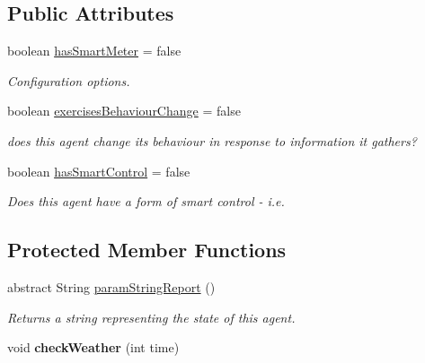 \subsection*{Public Attributes}
\begin{DoxyCompactItemize}
\item 
boolean \hyperlink{classuk_1_1ac_1_1dmu_1_1iesd_1_1cascade_1_1agents_1_1prosumers_1_1_prosumer_agent_a6d748d17b6118067086a69c34b4469a7}{has\-Smart\-Meter} = false
\begin{DoxyCompactList}\small\item\em Configuration options. \end{DoxyCompactList}\item 
\hypertarget{classuk_1_1ac_1_1dmu_1_1iesd_1_1cascade_1_1agents_1_1prosumers_1_1_prosumer_agent_ad113419e1d4f8d93f5e78c1460d7515c}{boolean \hyperlink{classuk_1_1ac_1_1dmu_1_1iesd_1_1cascade_1_1agents_1_1prosumers_1_1_prosumer_agent_ad113419e1d4f8d93f5e78c1460d7515c}{exercises\-Behaviour\-Change} = false}\label{classuk_1_1ac_1_1dmu_1_1iesd_1_1cascade_1_1agents_1_1prosumers_1_1_prosumer_agent_ad113419e1d4f8d93f5e78c1460d7515c}

\begin{DoxyCompactList}\small\item\em does this agent change its behaviour in response to information it gathers? \end{DoxyCompactList}\item 
boolean \hyperlink{classuk_1_1ac_1_1dmu_1_1iesd_1_1cascade_1_1agents_1_1prosumers_1_1_prosumer_agent_aafc0b05ea964cf7dcfc729a04814480b}{has\-Smart\-Control} = false
\begin{DoxyCompactList}\small\item\em Does this agent have a form of smart control -\/ i.\-e. \end{DoxyCompactList}\end{DoxyCompactItemize}
\subsection*{Protected Member Functions}
\begin{DoxyCompactItemize}
\item 
abstract String \hyperlink{classuk_1_1ac_1_1dmu_1_1iesd_1_1cascade_1_1agents_1_1prosumers_1_1_prosumer_agent_a204af2f60ecff60560da3ba5ae6ccb76}{param\-String\-Report} ()
\begin{DoxyCompactList}\small\item\em Returns a string representing the state of this agent. \end{DoxyCompactList}\item 
\hypertarget{classuk_1_1ac_1_1dmu_1_1iesd_1_1cascade_1_1agents_1_1prosumers_1_1_prosumer_agent_ae0a24383e5f3d03800911e69b294564b}{void {\bfseries check\-Weather} (int time)}\label{classuk_1_1ac_1_1dmu_1_1iesd_1_1cascade_1_1agents_1_1prosumers_1_1_prosumer_agent_ae0a24383e5f3d03800911e69b294564b}

\end{DoxyCompactItemize}
